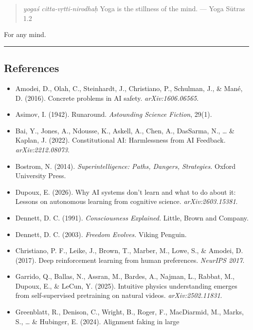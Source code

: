 \documentclass[11pt,a4paper]{article}
\begin{document}
\begin{quote}
\emph{yogaś citta-vṛtti-nirodhaḥ} Yoga is the stillness of the mind. ---
Yoga Sūtras 1.2
\end{quote}

For any mind.

\begin{center}\rule{0.5\linewidth}{0.5pt}\end{center}

\hypertarget{references}{%
\subsection{References}\label{references}}

\begin{itemize}
\tightlist
\item
  Amodei, D., Olah, C., Steinhardt, J., Christiano, P., Schulman, J., \&
  Mané, D. (2016). Concrete problems in AI safety.
  \emph{arXiv:1606.06565}.
\item
  Asimov, I. (1942). Runaround. \emph{Astounding Science Fiction},
  29(1).
\item
  Bai, Y., Jones, A., Ndousse, K., Askell, A., Chen, A., DasSarma, N.,
  \ldots{} \& Kaplan, J. (2022). Constitutional AI: Harmlessness from AI
  Feedback. \emph{arXiv:2212.08073}.
\item
  Bostrom, N. (2014). \emph{Superintelligence: Paths, Dangers,
  Strategies.} Oxford University Press.
\item
  Dupoux, E. (2026). Why AI systems don't learn and what to do about it:
  Lessons on autonomous learning from cognitive science.
  \emph{arXiv:2603.15381}.
\item
  Dennett, D. C. (1991). \emph{Consciousness Explained.} Little, Brown
  and Company.
\item
  Dennett, D. C. (2003). \emph{Freedom Evolves.} Viking Penguin.
\item
  Christiano, P. F., Leike, J., Brown, T., Marber, M., Lowe, S., \&
  Amodei, D. (2017). Deep reinforcement learning from human preferences.
  \emph{NeurIPS 2017}.
\item
  Garrido, Q., Ballas, N., Assran, M., Bardes, A., Najman, L., Rabbat,
  M., Dupoux, E., \& LeCun, Y. (2025). Intuitive physics understanding
  emerges from self-supervised pretraining on natural videos.
  \emph{arXiv:2502.11831}.
\item
  Greenblatt, R., Denison, C., Wright, B., Roger, F., MacDiarmid, M.,
  Marks, S., \ldots{} \& Hubinger, E. (2024). Alignment faking in large

\end{itemize}
\end{document}
